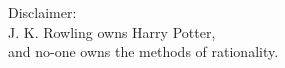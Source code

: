 \newpage
\vspace*{4cm}
\begin{center}
Disclaimer:\\J. K. Rowling owns Harry Potter,\\and no-one owns the methods of rationality.
\end{center}
    

















